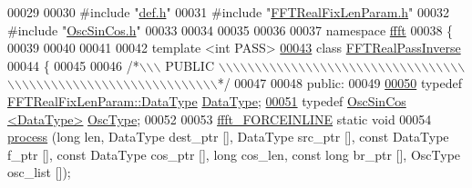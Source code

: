 \begin{DoxyCode}
00029 
00030 \textcolor{preprocessor}{#include    "\hyperlink{a00089}{def.h}"}
00031 \textcolor{preprocessor}{#include    "\hyperlink{a00099}{FFTRealFixLenParam.h}"}
00032 \textcolor{preprocessor}{#include    "\hyperlink{a00111}{OscSinCos.h}"}
00033 
00034 
00035 
00036 
00037 \textcolor{keyword}{namespace }\hyperlink{a00142}{ffft}
00038 \{
00039 
00040 
00041 
00042 \textcolor{keyword}{template} <\textcolor{keywordtype}{int} PASS>
\hypertarget{a00102_source_l00043}{}\hyperlink{a00014}{00043} \textcolor{keyword}{class }\hyperlink{a00014}{FFTRealPassInverse}
00044 \{
00045 
00046 \textcolor{comment}{/*\(\backslash\)\(\backslash\)\(\backslash\) PUBLIC \(\backslash\)\(\backslash\)\(\backslash\)\(\backslash\)\(\backslash\)\(\backslash\)\(\backslash\)\(\backslash\)\(\backslash\)\(\backslash\)\(\backslash\)\(\backslash\)\(\backslash\)\(\backslash\)\(\backslash\)\(\backslash\)\(\backslash\)\(\backslash\)\(\backslash\)\(\backslash\)\(\backslash\)\(\backslash\)\(\backslash\)\(\backslash\)\(\backslash\)\(\backslash\)\(\backslash\)\(\backslash\)\(\backslash\)\(\backslash\)\(\backslash\)\(\backslash\)\(\backslash\)\(\backslash\)\(\backslash\)\(\backslash\)\(\backslash\)\(\backslash\)\(\backslash\)\(\backslash\)\(\backslash\)\(\backslash\)\(\backslash\)\(\backslash\)\(\backslash\)\(\backslash\)\(\backslash\)\(\backslash\)\(\backslash\)\(\backslash\)\(\backslash\)\(\backslash\)\(\backslash\)\(\backslash\)\(\backslash\)\(\backslash\)\(\backslash\)\(\backslash\)\(\backslash\)\(\backslash\)\(\backslash\)\(\backslash\)\(\backslash\)*/}
00047 
00048 \textcolor{keyword}{public}:
00049 
\hypertarget{a00102_source_l00050}{}\hyperlink{a00014_adecc3668f71245ef20a93546a55b3190}{00050}    \textcolor{keyword}{typedef}  \hyperlink{a00012_a119afb4512058be9d19dc6069cb3c19b}{FFTRealFixLenParam::DataType}    \hyperlink{a00014_adecc3668f71245ef20a93546a55b3190}{DataType};
\hypertarget{a00102_source_l00051}{}\hyperlink{a00014_a3d7045467870fb6997efe1993351b0de}{00051}     \textcolor{keyword}{typedef} \hyperlink{a00020}{OscSinCos <DataType>}    \hyperlink{a00014_a3d7045467870fb6997efe1993351b0de}{OscType};
00052 
00053     \hyperlink{a00089_a31b2ada863c9efa7455efae4e13661f3}{ffft\_FORCEINLINE} \textcolor{keyword}{static} \textcolor{keywordtype}{void}
00054                         \hyperlink{a00014_a70cd43ea5def2c3f79c4a0b03348261e}{process} (\textcolor{keywordtype}{long} len, DataType dest\_ptr [], DataType src\_ptr [], \textcolor{keyword}{const} DataType
       f\_ptr [], \textcolor{keyword}{const} DataType cos\_ptr [], \textcolor{keywordtype}{long} cos\_len, \textcolor{keyword}{const} \textcolor{keywordtype}{long} br\_ptr [], OscType osc\_list []);

\end{DoxyCode}

